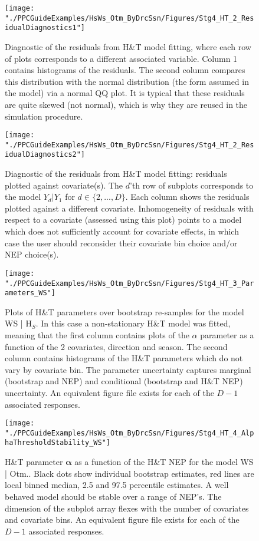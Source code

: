 \begin{figure}
	\centering
	\texttt{[image: "./PPCGuideExamples/HsWs\_Otm\_ByDrcSsn/Figures/Stg4\_HT\_2\_ResidualDiagnostics1"]}
	\caption{Diagnostic of the residuals from H\&T model fitting, where each row of plots corresponds to a different associated variable. Column 1 contains histograms of the residuals. The second column compares this distribution with the normal distribution (the form assumed in the model) via a normal QQ plot. It is typical that these residuals are quite skewed (not normal), which is why they are reused in the simulation procedure.}
	\label{fig:Ex_Stg4b1}
\end{figure}

\begin{figure}
	\centering
	\texttt{[image: "./PPCGuideExamples/HsWs\_Otm\_ByDrcSsn/Figures/Stg4\_HT\_2\_ResidualDiagnostics2"]}
	\caption{Diagnostic of the residuals from H\&T model fitting: residuals plotted against covariate(s). The $d$'th row of subplots corresponds to the model $Y_d | Y_1$ for $d \in \{2,...,D\}$. Each column shows the residuals plotted against a different covariate. Inhomogeneity of residuals with respect to a covariate (assessed using this plot) points to a model which does not sufficiently account for covariate effects, in which case the user should reconsider their covariate bin choice and/or NEP choice(s).}
	\label{fig:Ex_Stg4b2}
\end{figure}

\begin{figure}
	\centering
	\texttt{[image: "./PPCGuideExamples/HsWs\_Otm\_ByDrcSsn/Figures/Stg4\_HT\_3\_Parameters\_WS"]}
	\caption{Plots of H\&T parameters over bootstrap re-samples for the model WS | H$_S$. In this case a non-stationary H\&T model was fitted, meaning that the first column contains plots of the $\alpha$ parameter as a function of the 2 covariates, direction and season. The second column contains histograms of the H\&T parameters which do not vary by covariate bin. The parameter uncertainty captures marginal (bootstrap and NEP) and conditional (bootstrap and H\&T NEP) uncertainty. An equivalent figure file exists for each of the $D-1$ associated responses. }
	\label{fig:Ex_Stg4c}
\end{figure}

\begin{figure}
	\centering
	\texttt{[image: "./PPCGuideExamples/HsWs\_Otm\_ByDrcSsn/Figures/Stg4\_HT\_4\_AlphaThresholdStability\_WS"]}
	\caption{H\&T parameter $\boldsymbol{\alpha}$  as a function of the H\&T NEP for the model WS | Otm.. Black dots show individual bootstrap estimates, red lines are local binned median, 2.5 and 97.5 percentile estimates. A well behaved model should be stable over a range of NEP's. The dimension of the subplot array flexes with the number of covariates and covariate bins. An equivalent figure file exists for each of the $D-1$ associated responses.}
	\label{fig:Ex_Stg4d}
\end{figure}

